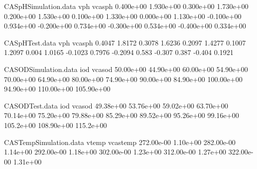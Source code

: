 
\begin{filecontents}{CASpHSimulation.data}
vph	vcasph
0.400e+00	1.930e+00
0.300e+00	1.730e+00
0.200e+00	1.530e+00
0.100e+00	1.330e+00
0.000e+00	1.130e+00
-0.100e+00	0.934e+00
-0.200e+00	0.734e+00
-0.300e+00	0.534e+00
-0.400e+00	0.334e+00
\end{filecontents}

\begin{filecontents}{CASpHTest.data}
vph	vcasph
0.4047	1.8172
0.3078	1.6236
0.2097	1.4277
0.1007	1.2097
0.004	1.0165
-0.1023	0.7976
-0.2094	0.583
-0.307	0.387
-0.404	0.1921
\end{filecontents}

\begin{filecontents}{CASODSimulation.data}
iod	vcasod
50.00e+00	44.90e+00
60.00e+00	54.90e+00
70.00e+00	64.90e+00
80.00e+00	74.90e+00
90.00e+00	84.90e+00
100.00e+00	94.90e+00
110.00e+00	105.90e+00
\end{filecontents}

\begin{filecontents}{CASODTest.data}
iod	vcasod
49.38e+00	53.76e+00
59.02e+00	63.70e+00
70.14e+00	75.20e+00
79.88e+00	85.29e+00
89.52e+00	95.26e+00
99.16e+00	105.2e+00
108.90e+00	115.2e+00
\end{filecontents}

\begin{filecontents}{CASTempSimulation.data}
vtemp	vcastemp
272.00e-00	1.10e+00
282.00e-00	1.14e+00
292.00e-00	1.18e+00
302.00e-00	1.23e+00
312.00e-00	1.27e+00
322.00e-00	1.31e+00
\end{filecontents}
